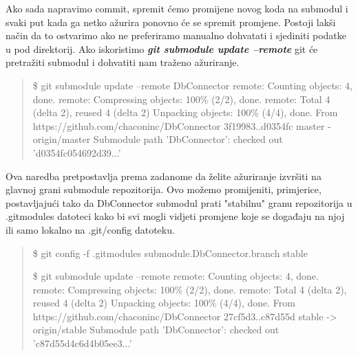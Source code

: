 \documentclass {article}
\begin{document}
\begin{enumerate}
\begin{enumerate}
Ako sada napravimo commit, spremit ćemo promijene novog koda na submodul i svaki put kada ga netko ažurira ponovno će se spremit promjene.
\newline Postoji lakši način da to ostvarimo ako ne preferiramo manualno dohvatati i sjediniti podatke u pod direktorij. Ako iskoristimo \textbf{\emph{git submodule update --remote}} git će pretražiti submodul i dohvatiti nam traženo ažuriranje.
\newline 
\begin{quote}
    \$ git submodule update --remote DbConnector
\newline remote: Counting objects: 4, done.
\newline remote: Compressing objects: 100\% (2/2), done.
\newline remote: Total 4 (delta 2), reused 4 (delta 2)
\newline Unpacking objects: 100\% (4/4), done.
\newline From https://github.com/chaconinc/DbConnector
\newline         3f19983..d0354fc  master     - origin/master
\newline Submodule path 'DbConnector': checked out 'd0354fc054692d39...'
\newline
\end{quote}
Ova naredba pretpostavlja prema zadanome da želite ažuriranje izvršiti na glavnoj grani submodule repozitorija. Ovo možemo promijeniti, primjerice, postavljajući tako da DbConnector submodul prati "stabilnu" granu repozitorija u .gitmodules datoteci kako bi svi mogli vidjeti promjene koje se događaju na njoj ili samo lokalno na .git/config datoteku.
\newline
    \begin{quote}
        \$ git config -f .gitmodules submodule.DbConnector.branch stable

\$ git submodule update --remote
\newline remote: Counting objects: 4, done.
\newline remote: Compressing objects: 100\% (2/2), done.
\newline remote: Total 4 (delta 2), reused 4 (delta 2)
\newline Unpacking objects: 100\% (4/4), done.
\newline From https://github.com/chaconinc/DbConnector
\newline 27cf5d3..c87d55d  stable -> origin/stable
\newline Submodule path 'DbConnector': checked out 'c87d55d4c6d4b05ee3...'
    \end{quote}
\newpage


\end{enumerate}
\end{enumerate}
\end{document}
